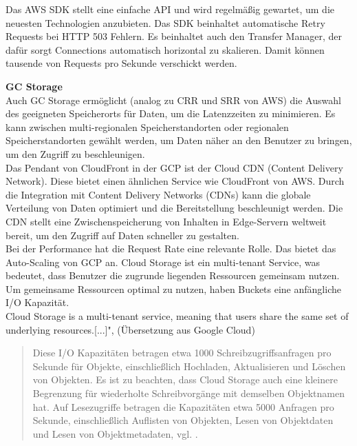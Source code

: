 Das AWS SDK stellt eine einfache API und wird regelmäßig gewartet, um die neuesten Technologien anzubieten. Das SDK beinhaltet automatische Retry Requests bei HTTP 503 Fehlern. Es beinhaltet auch den Transfer Manager, der dafür sorgt Connections automatisch horizontal zu skalieren. Damit können tausende von Requests pro Sekunde verschickt werden.

\newpage

\textbf{GC Storage}\\

Auch GC Storage ermöglicht (analog zu CRR und SRR von AWS) die Auswahl des geeigneten Speicherorts für Daten, um die Latenzzeiten zu minimieren. Es kann zwischen multi-regionalen Speicherstandorten oder regionalen Speicherstandorten gewählt werden, um Daten näher an den Benutzer zu bringen, um den Zugriff zu beschleunigen.\\ 

Das Pendant von CloudFront in der GCP ist der Cloud CDN (Content Delivery Network). Diese bietet einen ähnlichen Service wie CloudFront von AWS. Durch die Integration mit Content Delivery Networks (CDNs) kann die globale Verteilung von Daten optimiert und die Bereitstellung beschleunigt werden. Die CDN stellt eine Zwischenspeicherung von Inhalten in Edge-Servern weltweit bereit, um den Zugriff auf Daten schneller zu gestalten.\\

Bei der Performance hat die Request Rate eine relevante Rolle. Das bietet das Auto-Scaling von GCP an. Cloud Storage ist ein multi-tenant Service, was bedeutet, dass Benutzer die zugrunde liegenden Ressourcen gemeinsam nutzen. Um gemeinsame Ressourcen optimal zu nutzen, haben Buckets eine anfängliche I/O Kapazität.\\ \glqq Cloud Storage is a multi-tenant service, meaning that users share the same set of underlying resources.[...]", \cite{gcp-autoscale} (Übersetzung aus Google Cloud)

 \begin{quote}
 	Diese I/O Kapazitäten betragen etwa 1000 Schreibzugriffsanfragen pro Sekunde für Objekte, einschließlich Hochladen, Aktualisieren und Löschen von Objekten. Es ist zu beachten, dass Cloud Storage auch eine kleinere Begrenzung für wiederholte Schreibvorgänge mit demselben Objektnamen hat. Auf Lesezugriffe betragen die Kapazitäten etwa 5000 Anfragen pro Sekunde, einschließlich Auflisten von Objekten, Lesen von Objektdaten und Lesen von Objektmetadaten, vgl. \cite{gcp-autoscale}.
 \end{quote}
 
